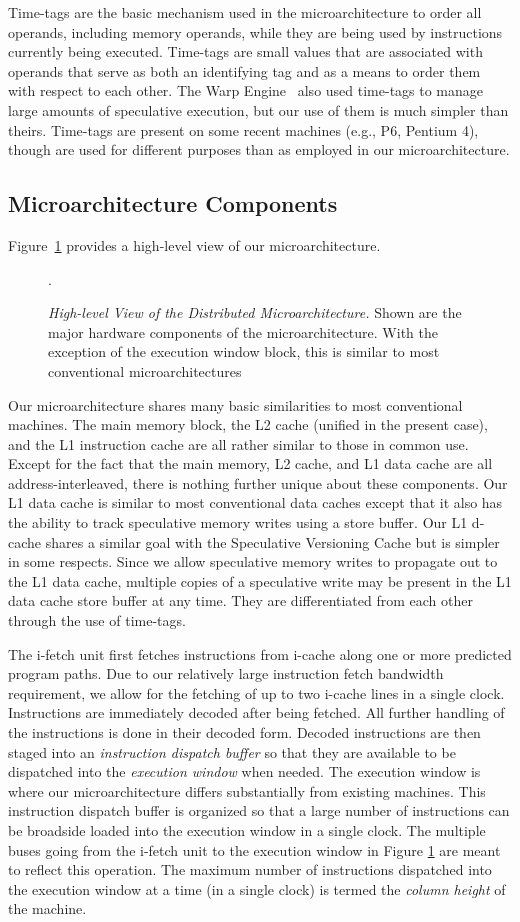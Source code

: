 \documentclass[10pt,twocolumn,dvips]{article}
\begin{document}
Time-tags are the basic mechanism
used in the microarchitecture to order all operands, including
memory operands, while they are being used by instructions
currently being executed.  Time-tags are small values that
are associated with operands that serve as both an identifying
tag and as a means to order them with respect to each other.
The Warp Engine~\cite{Cle95}
also used time-tags to manage large amounts of speculative execution,
but our use of them is much simpler than theirs.
Time-tags are present on some recent machines (e.g., P6, Pentium 4),
though are used for different purposes than as 
employed in our microarchitecture.   
%
%
\subsection{Microarchitecture Components}
%
Figure~\ref{fig:high} provides a high-level view of our microarchitecture.
%
\begin{figure}
\centering
{}
\caption{{\em High-level View of the Distributed Microarchitecture.} 
Shown are the major hardware components of the microarchitecture.
With the exception of the 
execution window block, this is similar to most conventional
microarchitectures}.
\label{fig:high}
\end{figure}
%
Our microarchitecture shares many basic 
similarities to most conventional
machines.
The main memory block,
the L2 cache (unified in the present case), and the L1 instruction 
cache are all rather similar to those in common use.
Except for the fact that the main memory, L2 cache, and L1 data
cache are all address-interleaved, there is nothing further
unique about these components. 
Our L1 data cache is similar to
most conventional data caches except that it also has the ability to
track speculative memory writes using a store buffer.
Our L1 d-cache shares a similar goal with the 
Speculative Versioning Cache \cite{Gop98} 
but is simpler in some respects.
Since we allow speculative memory writes to propagate
out to the L1 data cache, multiple copies
of a speculative write may be present in the L1 data cache store buffer 
at any time.  They are differentiated from each other
through the use of time-tags.  

The i-fetch unit first fetches instructions from i-cache
along one or more predicted program paths.
Due to our relatively large instruction fetch bandwidth
requirement, we allow for the fetching of up to two i-cache
lines in a single clock.
Instructions are immediately
decoded after being fetched.
All further handling of the instructions is done in their decoded
form.
Decoded instructions are then staged
into an {\em instruction dispatch buffer}
so that they are available to be dispatched
into the {\em execution window} when needed.  
The execution window is where
our microarchitecture differs substantially from existing machines.
This instruction dispatch buffer is organized so that
a large number of instructions can be broadside loaded into the
execution window in a single clock.
The multiple buses going from the i-fetch unit to the
execution window in Figure \ref{fig:high} are meant to
reflect this operation.  
The maximum number of instructions dispatched into the
execution window at a time (in a single clock) is termed
the {\em column height} of the machine.  
%
%
\end{document}
